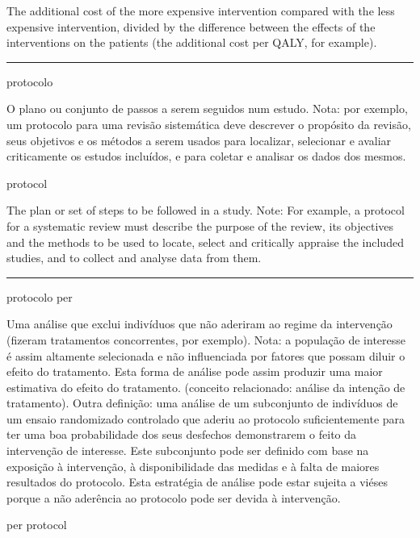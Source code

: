 \documentclass[
]{book}
\begin{document}
The additional cost of the more expensive intervention compared with the less expensive intervention, divided by the difference between the effects of the interventions on the patients (the additional cost per QALY, for example).

\begin{center}\rule{0.5\linewidth}{0.5pt}\end{center}

protocolo

O plano ou conjunto de passos a serem seguidos num estudo. Nota: por exemplo, um protocolo para uma revisão sistemática deve descrever o propósito da revisão, seus objetivos e os métodos a serem usados para localizar, selecionar e avaliar criticamente os estudos incluídos, e para coletar e analisar os dados dos mesmos.

protocol

The plan or set of steps to be followed in a study. Note: For example, a protocol for a systematic review must describe the purpose of the review, its objectives and the methods to be used to locate, select and critically appraise the included studies, and to collect and analyse data from them.

\begin{center}\rule{0.5\linewidth}{0.5pt}\end{center}

protocolo per

Uma análise que exclui indivíduos que não aderiram ao regime da intervenção (fizeram tratamentos concorrentes, por exemplo). Nota: a população de interesse é assim altamente selecionada e não influenciada por fatores que possam diluir o efeito do tratamento. Esta forma de análise pode assim produzir uma maior estimativa do efeito do tratamento. (conceito relacionado: análise da intenção de tratamento). Outra definição: uma análise de um subconjunto de indivíduos de um ensaio randomizado controlado que aderiu ao protocolo suficientemente para ter uma boa probabilidade dos seus desfechos demonstrarem o feito da intervenção de interesse. Este subconjunto pode ser definido com base na exposição à intervenção, à disponibilidade das medidas e à falta de maiores resultados do protocolo. Esta estratégia de análise pode estar sujeita a viéses porque a não aderência ao protocolo pode ser devida à intervenção.

per protocol
\end{document}
